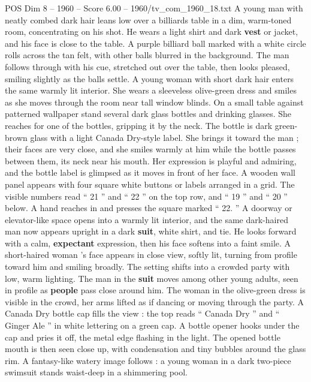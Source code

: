 \begin{textsample}{POS Dim 8 – 1960 – Score 6.00 – 1960/tv\_com\_1960\_18.txt}  \label{ex:f8_pos_083}
A young man with neatly combed dark hair leans low over a billiards table in a dim, warm-toned room, concentrating on his shot.
He wears a light shirt and dark \textbf{vest} or jacket, and his face is close to the table.
A purple billiard ball marked with a white circle rolls across the tan felt, with other balls blurred in the background.
The man follows through with his cue, stretched out over the table, then looks pleased, smiling slightly as the balls settle.
A young woman with short dark hair enters the same warmly lit interior.
She wears a sleeveless olive-green dress and smiles as she moves through the room near tall window blinds.
On a small table against patterned wallpaper stand several dark glass bottles and drinking glasses.
She reaches for one of the bottles, gripping it by the neck.
The bottle is dark green-brown glass with a light Canada Dry-style label.
She brings it toward the man ; their faces are very close, and she smiles warmly at him while the bottle passes between them, its neck near his mouth.
Her expression is playful and admiring, and the bottle label is glimpsed as it moves in front of her face.
A wooden wall panel appears with four square white buttons or labels arranged in a grid.
The visible numbers read “ 21 ” and “ 22 ” on the top row, and “ 19 ” and “ 20 ” below.
A hand reaches in and presses the square marked “ 22. ” A doorway or elevator-like space opens into a warmly lit interior, and the same dark-haired man now appears upright in a dark \textbf{suit}, white shirt, and tie.
He looks forward with a calm, \textbf{expectant} expression, then his face softens into a faint smile.
A short-haired woman ’s face appears in close view, softly lit, turning from profile toward him and smiling broadly.
The setting shifts into a crowded party with low, warm lighting.
The man in the \textbf{suit} moves among other young adults, seen in profile as \textbf{people} pass close around him.
The woman in the olive-green dress is visible in the crowd, her arms lifted as if dancing or moving through the party.
A Canada Dry bottle cap fills the view : the top reads “ Canada Dry ” and “ Ginger Ale ” in white lettering on a green cap.
A bottle opener hooks under the cap and pries it off, the metal edge flashing in the light.
The opened bottle mouth is then seen close up, with condensation and tiny bubbles around the glass rim.
A fantasy-like watery image follows : a young woman in a dark two-piece swimsuit stands waist-deep in a shimmering pool.

\end{textsample}
